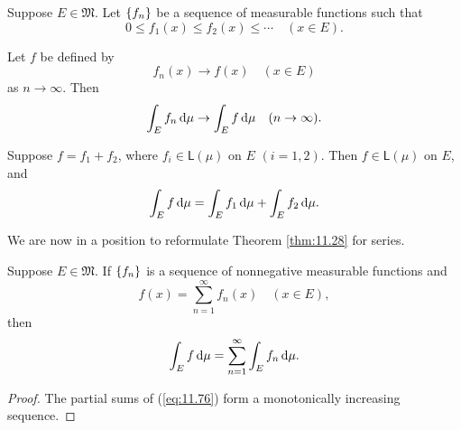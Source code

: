 \begin{thm}
    \label{thm:11.28}
    Suppose $E \in \mathfrak{M}$. Let $\protect\{f_n\}$ be
    a sequence of measurable functions such that
    \begin{equation}
        \label{eq:11.64}
        0 \leq f_1(x) \leq f_2(x) \leq \cdots 
        \quad (x \in E).
    \end{equation}

    Let $f$ be defined by 
    \begin{equation}
        \label{eq:11.65}
        f_n(x) \rightarrow f(x)
        \quad (x \in E)
    \end{equation}
    as $n \rightarrow \infty$. 
    Then 
    \begin{equation}
        \label{eq:11.66}
        \int_E f_n \d \mu \rightarrow
        \int_E f \d \mu 
        \quad (n \rightarrow \infty).
    \end{equation}
\end{thm}

\begin{thm}
    \label{thm:11.29}
    Suppose $f = f_1 + f_2$, where $f_i \in \mathsf{L}(\mu)$ on $E$ $(i = 1,2)$. 
    Then $f \in \mathsf{L}(\mu)$ on $E$, and 
    \begin{equation}
        \label{eq:11.73}
        \int_E f \d \mu = 
        \int_E f_1 \d \mu +
        \int_E f_2 \d \mu .
    \end{equation}
\end{thm}

We are now in a position to reformulate Theorem \ref{thm:11.28} for series.

\begin{thm}
    \label{thm:11.30}
    Suppose $E \in \mathfrak{M}$. 
    If $\protect\{f_n\}$ is a sequence of nonnegative measurable functions and 
    \begin{equation}
        \label{eq:11.76}
        f(x) = \sum_{n=1}^{\infty} f_n (x)
        \quad (x \in E),
    \end{equation}
    then 
    \begin{equation*}
        \int_E f \d \mu = 
        \sum_{n=1}^{\infty} \int_E f_n \d \mu .
    \end{equation*}
\end{thm}

\begin{proof}
    The partial sums of (\ref{eq:11.76}) form a monotonically increasing sequence.
\end{proof}

